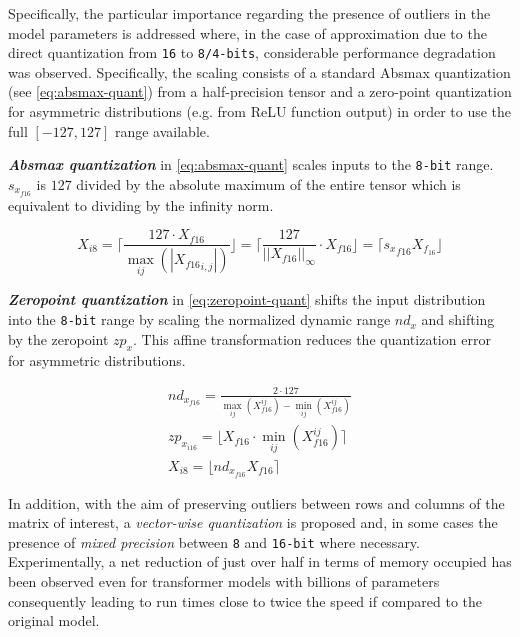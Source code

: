 Specifically, the particular importance regarding the presence of outliers in the model parameters is addressed where, in the case of approximation due to the direct quantization from \texttt{16} to \texttt{8/4-bits}, considerable performance degradation was observed. Specifically, the scaling consists of a standard Absmax quantization (see \ref{eq:absmax-quant}) from a half-precision tensor and a zero-point quantization for asymmetric distributions (e.g. from ReLU function output) in order to use the full $[-127, 127]$ range available.

\textbf{\textit{Absmax quantization}} in \ref{eq:absmax-quant} scales inputs to the \texttt{8-bit} range. $s_{x_{f16}}$ is $127$ divided by the absolute maximum of the entire tensor which is equivalent to dividing by the infinity norm.

\begin{equation}
    X_{i 8} = \biggl \lceil \frac{127 \cdot X_{f16}}{\max_{ij}{(|{X_{f16}}_{i,j} |)}}  \biggr \rfloor = 
\biggl \lceil \frac{127}{||X_{f16}||_{\infty}} \cdot X_{f16} \biggr \rfloor = 
\lceil {s_x}_{f16} X_{f_16} \rfloor
\label{eq:absmax-quant}
\end{equation}

\textbf{\textit{Zeropoint quantization}} in \ref{eq:zeropoint-quant} shifts the input distribution into the \texttt{8-bit} range by scaling the normalized dynamic range $nd_x$ and shifting by the zeropoint $zp_x$. This affine transformation reduces the quantization error for asymmetric distributions.

\begin{equation}
\begin{gathered}
nd_{x_{f16}} = \frac{2 \cdot 127}{\max_{ij} ( X^{ij}_{f16} ) - \min_{ij} (X^{ij}_{f16})} \\ 
zp_{x_{i16}} = \lfloor X_{f16} \cdot \min_{ij} (X^{ij}_{f16}) \rceil \\
X_{i8} = \lfloor nd_{x_{f16}} X_{f16} \rceil
\end{gathered}
\label{eq:zeropoint-quant}
\end{equation}

In addition, with the aim of preserving outliers between rows and columns of the matrix of interest, a \textit{vector-wise quantization} is proposed and, in some cases the presence of \textit{mixed precision} between \texttt{8} and \texttt{16-bit} where necessary. Experimentally, a net reduction of just over half in terms of memory occupied has been observed even for transformer models with billions of parameters consequently leading to run times close to twice the speed if compared to the original model.



